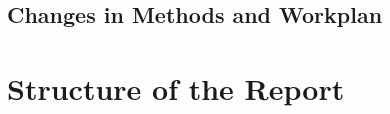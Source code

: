 
\subsection{Changes in Methods and Workplan}
\lipsum[1]



\section{Structure of the Report}
\lipsum[1]





